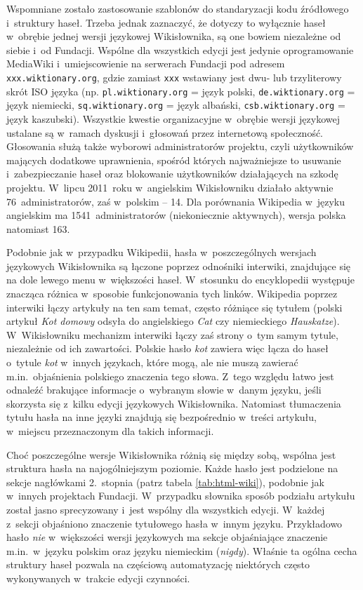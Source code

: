 \documentclass{pracamgr}
\begin{document}
Wspomniane zostało zastosowanie szablonów do standaryzacji kodu źródłowego i~struktury haseł. Trzeba jednak zaznaczyć, że dotyczy to wyłącznie haseł w~obrębie jednej wersji językowej Wikisłownika, są one bowiem niezależne od siebie i~od Fundacji. Wspólne dla wszystkich edycji jest jedynie oprogramowanie MediaWiki i~umiejscowienie na serwerach Fundacji pod adresem \texttt{xxx.wiktionary.org}, gdzie zamiast \texttt{xxx} wstawiany jest dwu- lub trzyliterowy skrót ISO języka (np. \texttt{pl.wiktionary.org} = język polski, \texttt{de.wiktionary.org} = język niemiecki, \texttt{sq.wiktionary.org} = język albański, \texttt{csb.wiktionary.org} = język kaszubski). Wszystkie kwestie organizacyjne w~obrębie wersji językowej ustalane są w~ramach dyskusji i~głosowań przez internetową społeczność. Głosowania służą także wyborowi administratorów projektu, czyli użytkowników mających dodatkowe uprawnienia, spośród których najważniejsze to usuwanie i~zabezpieczanie haseł oraz blokowanie użytkowników działających na szkodę projektu. W~lipcu 2011~roku w~angielskim Wikisłowniku działało aktywnie 76~administratorów, %
zaś w~polskim -- 14. %
Dla porównania Wikipedia w~języku angielskim ma 1541~administratorów (niekoniecznie aktywnych), wersja polska natomiast 163. %

Podobnie jak w~przypadku Wikipedii, hasła w~poszczególnych wersjach językowych Wikisłownika są łączone poprzez odnośniki interwiki, znajdujące się na dole lewego menu w~większości haseł. W~stosunku do encyklopedii występuje znacząca różnica w~sposobie funkcjonowania tych linków. Wikipedia poprzez interwiki łączy artykuły na ten sam temat, często różniące się tytułem (polski artykuł \emph{Kot domowy} odsyła do angielskiego \emph{Cat} czy niemieckiego \emph{Hauskatze}). W~Wikisłowniku mechanizm interwiki łączy zaś strony o~tym samym tytule, niezależnie od ich zawartości. Polskie hasło \emph{kot} zawiera więc łącza do haseł o~tytule \emph{kot} w~innych językach, które mogą, ale nie muszą zawierać m.in.\ objaśnienia polskiego znaczenia tego słowa. Z~tego względu łatwo jest odnaleźć brakujące informacje o~wybranym słowie w~danym języku, jeśli skorzysta się z~kilku edycji językowych Wikisłownika. Natomiast tłumaczenia tytułu hasła na inne języki znajdują się bezpośrednio w~treści artykułu, w~miejscu przeznaczonym dla takich informacji.

Choć poszczególne wersje Wikisłownika różnią się między sobą, wspólna jest struktura hasła na najogólniejszym poziomie. Każde hasło jest podzielone na sekcje nagłówkami 2.~stopnia (patrz tabela \ref{tab:html-wiki}), podobnie jak w~innych projektach Fundacji. W~przypadku słownika sposób podziału artykułu został jasno sprecyzowany i~jest wspólny dla wszystkich edycji. W~każdej z~sekcji objaśniono znaczenie tytułowego hasła w~innym języku. Przykładowo hasło \emph{nie} w~większości wersji językowych ma sekcje objaśniające znaczenie m.in.\ w~języku polskim oraz języku niemieckim (\emph{nigdy}). Właśnie ta ogólna cecha struktury haseł pozwala na częściową automatyzację niektórych często wykonywanych w~trakcie edycji czynności.
\end{document}

